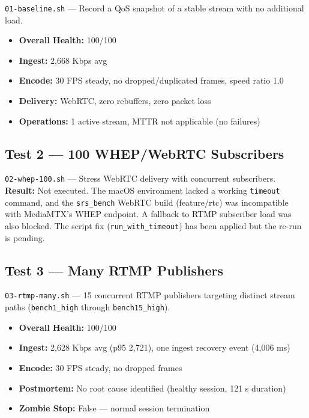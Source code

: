 \documentclass[a4paper,11pt]{article}
\begin{document}
\texttt{01-baseline.sh} --- Record a QoS snapshot of a stable stream with no additional load.

\begin{itemize}
  \item \textbf{Overall Health:} 100/100
  \item \textbf{Ingest:} 2,668 Kbps avg
  \item \textbf{Encode:} 30 FPS steady, no dropped/duplicated frames, speed ratio 1.0
  \item \textbf{Delivery:} WebRTC, zero rebuffers, zero packet loss
  \item \textbf{Operations:} 1 active stream, MTTR not applicable (no failures)
\end{itemize}

\subsection{Test 2 --- 100 WHEP/WebRTC Subscribers}

\texttt{02-whep-100.sh} --- Stress WebRTC delivery with concurrent subscribers.\\
\textbf{Result:} Not executed. The macOS environment lacked a working \texttt{timeout} command, and the \texttt{srs\_bench} WebRTC build (feature/rtc) was incompatible with MediaMTX's WHEP endpoint. A fallback to RTMP subscriber load was also blocked. The script fix (\texttt{run\_with\_timeout}) has been applied but the re-run is pending.

\subsection{Test 3 --- Many RTMP Publishers}

\texttt{03-rtmp-many.sh} --- 15 concurrent RTMP publishers targeting distinct stream paths (\texttt{bench1\_high} through \texttt{bench15\_high}).

\begin{itemize}
  \item \textbf{Overall Health:} 100/100
  \item \textbf{Ingest:} 2,628 Kbps avg (p95 2,721), one ingest recovery event (4,006 ms)
  \item \textbf{Encode:} 30 FPS steady, no dropped frames
  \item \textbf{Postmortem:} No root cause identified (healthy session, 121 s duration)
  \item \textbf{Zombie Stop:} False --- normal session termination
\end{itemize}
\end{document}

